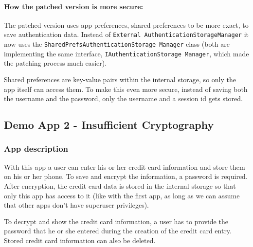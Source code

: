 \paragraph{How the patched version is more secure:}
The patched version uses app preferences, shared preferences to be more exact, to save authentication data. Instead of \texttt{External AuthenticationStorageManager} it now uses the \texttt{SharedPrefsAuthenticationStorage Manager} class (both are implementing the same interface, \texttt{IAuthenticationStorage Manager}, which made the patching process much easier).

Shared preferences are key-value pairs within the internal storage, so only the app itself can access them. To make this even more secure, instead of saving both the username and the password, only the username and a session id gets stored. 



\subsection{Demo App 2 - Insufficient Cryptography}\label{sec:app1}
\subsubsection{App description}
With this app a user can enter his or her credit card information and store them on his or her phone. To save and encrypt the information, a password is required. After encryption, the credit card data is stored in the internal storage so that only this app has access to it (like with the first app, as long as we can assume that other apps don't have superuser privileges).

To decrypt and show the credit card information, a user has to provide the password that he or she entered during the creation of the credit card entry. Stored credit card information can also be deleted.

